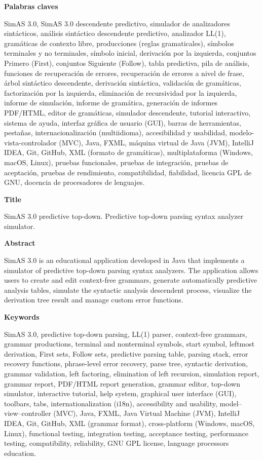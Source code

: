 \documentclass[a4paper,12pt,twoside,final]{book}
\begin{document}
\textbf{Palabras claves}

\normalsize{SimAS 3.0, SimAS 3.0 descendente predictivo, simulador de analizadores sintácticos, análisis sintáctico descendente predictivo, analizador LL(1), gramáticas de contexto libre, producciones (reglas gramaticales), símbolos terminales y no terminales, símbolo inicial, derivación por la izquierda, conjuntos Primero (First), conjuntos Siguiente (Follow), tabla predictiva, pila de análisis, funciones de recuperación de errores, recuperación de errores a nivel de frase, árbol sintáctico descendente, derivación sintáctica, validación de gramáticas, factorización por la izquierda, eliminación de recursividad por la izquierda, informe de simulación, informe de gramática, generación de informes PDF/HTML, editor de gramáticas, simulador descendente, tutorial interactivo, sistema de ayuda, interfaz gráfica de usuario (GUI), barras de herramientas, pestañas, internacionalización (multiidioma), accesibilidad y usabilidad, modelo-vista-controlador (MVC), Java, FXML, máquina virtual de Java (JVM), IntelliJ IDEA, Git, GitHub, XML (formato de gramáticas), multiplataforma (Windows, macOS, Linux), pruebas funcionales, pruebas de integración, pruebas de aceptación, pruebas de rendimiento, compatibilidad, fiabilidad, licencia GPL de GNU, docencia de procesadores de lenguajes.}


\cleardoublepage

\thispagestyle{empty}
\pagecolor{white}

\Huge{\textbf{Title }}

\normalsize{SimAS 3.0 predictive top-down. Predictive top-down parsing syntax analyzer simulator.}

\Large{\textbf{Abstract }}

\normalsize{SimAS 3.0 is an educational application developed in Java that implements a simulator of predictive top-down parsing syntax analyzers. The application allows users to create and edit context-free grammars, generate automatically predictive analysis tables, simulate the syntactic analysis descendent process, visualize the derivation tree result and manage custom error functions.}


\textbf{Keywords}

\normalsize{SimAS 3.0, predictive top-down parsing, LL(1) parser, context-free grammars, grammar productions, terminal and nonterminal symbols, start symbol, leftmost derivation, First sets, Follow sets, predictive parsing table, parsing stack, error recovery functions, phrase-level error recovery, parse tree, syntactic derivation, grammar validation, left factoring, elimination of left recursion, simulation report, grammar report, PDF/HTML report generation, grammar editor, top-down simulator, interactive tutorial, help system, graphical user interface (GUI), toolbars, tabs, internationalization (i18n), accessibility and usability, model–view–controller (MVC), Java, FXML, Java Virtual Machine (JVM), IntelliJ IDEA, Git, GitHub, XML (grammar format), cross-platform (Windows, macOS, Linux), functional testing, integration testing, acceptance testing, performance testing, compatibility, reliability, GNU GPL license, language processors education.}
\end{document}
